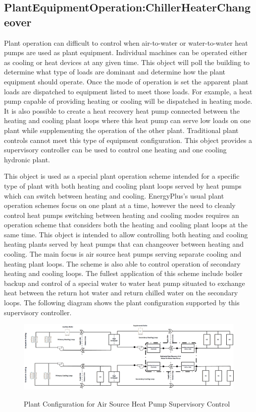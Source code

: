 \subsection{PlantEquipmentOperation:ChillerHeaterChangeover}\label{plantequipmentoperationchillerheaterchangeover}

Plant operation can difficult to control when air-to-water or water-to-water heat pumps are used as plant equipment.  Individual machines can be operated either as cooling or heat devices at any given time.  This object will poll the building to determine what type of loads are dominant and determine how the plant equipment should operate. Once the mode of operation is set the apparent plant loads are dispatched to equipment listed to meet those loads. For example, a heat pump capable of providing heating or cooling will be dispatched in heating mode. It is also possible to create a heat recovery heat pump connected between the heating and cooling plant loops where this heat pump can serve low loads on one plant while supplementing the operation of the other plant. Traditional plant controls cannot meet this type of equipment configuration. This object provides a supervisory controller can be used to control one heating and one cooling hydronic plant.

This object is used as a special plant operation scheme intended for a specific type of plant with both heating and cooling plant loops served by heat pumps which can switch between heating and cooling.  EnergyPlus's usual plant operation schemes focus on one plant at a time, however the need to cleanly control heat pumps switching between heating and cooling modes requires an operation scheme that considers both the heating and cooling plant loops at the same time.  This object is intended to allow controlling both heating and cooling heating plants served by heat pumps that can changeover between heating and cooling.  The main focus is air source heat pumps serving separate cooling and heating plant loops.  The scheme is also able to control operation of secondary heating and cooling loops.  The fullest application of this scheme include boiler backup and control of a special water to water heat pump situated to exchange heat between the return hot water and return chilled water on the secondary loops. The following diagram shows the plant configuration supported by this supervisory controller. 

\begin{figure}[hbtp]
\centering
\includegraphics[width=1.0\textwidth, height=1.0\textheight, keepaspectratio=true]{media/ASHP_Plant.png}
\caption{Plant Configuration for Air Source Heat Pump Supervisory Control} \protect \label{fig:IO-ref-ASHP-Plant-Diag}
\end{figure}


